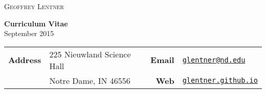 
\begin{multicols}{2}[]

\huge
\textsc{Geoffrey Lentner}

\normalsize
\begin{flushright}
\textbf{Curriculum Vitae}\\
September 2015
\end{flushright}

\end{multicols}



\bigskip
\normalsize
\begin{tabular}{rlrl}
\textbf{Address} & 225 Nieuwland Science Hall & \textbf{Email} & 
					\href{mailto:glentner@nd.edu}{\small\texttt{{glentner@nd.edu}}} \\

                 & Notre Dame, IN 46556       & \textbf{Web}   & 
				 	\href{http://glentner.github.io}{\small\texttt{{glentner.github.io}}}
\end{tabular}



\smallskip
\noindent\makebox[\linewidth]{\rule{\textwidth}{0.4pt}}

